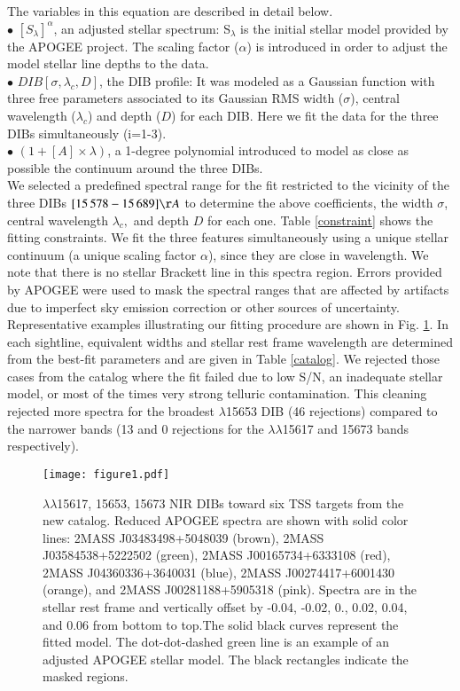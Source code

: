 \documentclass[printer]{aa} %
\begin{document}
The variables in this equation are described in detail below.\\
$\bullet$ $[S_\lambda]^\alpha$, an adjusted stellar spectrum: S$_\lambda$ is the initial stellar model provided by the APOGEE project. The scaling factor ($\alpha$) is introduced in order to adjust the model stellar line depths to the data.\\  
$\bullet$ $DIB[\sigma,\lambda_c,D]$, the DIB profile: It was modeled as a Gaussian function with three free parameters associated to its Gaussian RMS width ($\sigma$), central wavelength ($\lambda_c$) and depth ($D$) for each DIB. Here we fit the data for the three DIBs simultaneously (i=1-3).\\
$\bullet$ $(1+[A] \times \lambda)$, a 1-degree polynomial introduced to model as close as possible the continuum around the three DIBs.\\
We selected a predefined spectral range for the fit restricted to the vicinity of the three DIBs $ [15\,578-15\,689]\AA$ to determine the above coefficients, the width $\sigma$, central wavelength $\lambda_c,$ and depth $D$ for each one.  Table \ref{constraint} shows the fitting constraints. We fit the three features simultaneously using a unique stellar continuum (a unique scaling factor $\alpha$), since they are close in wavelength. We note that there is no stellar Brackett line in this spectra region. Errors provided by APOGEE were used to mask the spectral ranges that are affected by artifacts due to imperfect sky emission correction or other sources of uncertainty. 
Representative examples illustrating our fitting procedure are shown in Fig. \ref{exemples}. In each sightline, equivalent widths and stellar rest frame wavelength are determined from the best-fit parameters and are given in Table \ref{catalog}.
 We rejected those cases from the catalog where the fit failed due to low S/N, an inadequate stellar model, or most of the times very strong telluric contamination. This cleaning rejected more spectra for the broadest $\lambda$15653 DIB (46 rejections) compared to the narrower bands (13 and 0 rejections for the $\lambda\lambda$15617
and 15673 bands respectively). 
\begin{figure}[!htb]
  \centering
   \texttt{[image: figure1.pdf]}
      \caption{ $\lambda\lambda$15617, 15653, 15673 NIR DIBs toward six TSS targets from the new catalog. Reduced APOGEE spectra are shown with solid color lines: 2MASS J03483498+5048039 (brown), 2MASS J03584538+5222502 (green), 2MASS J00165734+6333108 (red), 2MASS J04360336+3640031 (blue), 2MASS J00274417+6001430 (orange), and 2MASS J00281188+5905318 (pink). Spectra are in the stellar rest frame and vertically offset by -0.04, -0.02, 0., 0.02, 0.04, and 0.06 from bottom to top.The solid black curves represent the fitted model. The dot-dot-dashed green line is an example of an adjusted APOGEE stellar model. The black rectangles indicate the masked regions.}
         \label{exemples}
   \end{figure}
\end{document}
